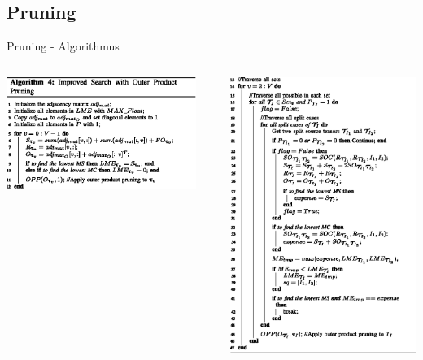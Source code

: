 \documentclass{beamer}
\begin{document}
\subsection{Pruning}

\begin{frame}{Pruning - Algorithmus}
	\begin{columns}
		\begin{column}{0.48\textwidth}
			\includegraphics[scale=.7]{algorithm_04_top}
		\end{column}
		\begin{column}{0.02\textwidth}
		\end{column}
		\begin{column}{0.5\textwidth}
			\includegraphics[scale=.5]{algorithm_04_bottom}

\end{column}
\end{columns}
\end{frame}
\end{document}
